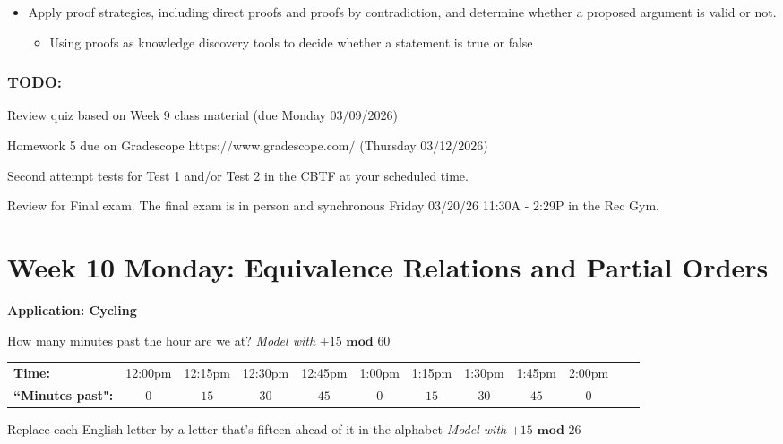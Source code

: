 \documentclass[12pt, oneside]{article}
\begin{document}
\begin{itemize}
\item Apply proof strategies, including direct proofs and proofs by contradiction, and determine whether a proposed argument is valid or not.
\begin{itemize}
    \item Using proofs as knowledge discovery tools to decide whether a statement is true or false
\end{itemize}
\end{itemize}

\subsubsection*{TODO:}
\begin{list}
   {\itemsep2pt}
    \item Review quiz based on Week 9 class material (due Monday 03/09/2026)
    \item Homework 5 due on Gradescope https://www.gradescope.com/ (Thursday 03/12/2026)
    \item Second attempt tests for Test 1 and/or Test 2 in the CBTF at your scheduled time.
   \item Review for Final exam. The final exam is in person and synchronous Friday 03/20/26 11:30A - 2:29P  in the Rec Gym.
\end{list}

\newpage
\section*{Week 10 Monday: Equivalence Relations and Partial Orders}


{\bf Application: Cycling}

How many minutes past the hour are we at?  \hfill {\it Model with} $+15 \textbf{ mod } 60$

\begin{tabular}{lccccccccccc}
{\bf Time:} &12:00pm  &12:15pm&12:30pm  &12:45pm&1:00pm  &1:15pm&1:30pm  &1:45pm&2:00pm \\
{\bf ``Minutes past":} &$0$ & $15$ & $30$ & $45$ &$0$ & $15$ & $30$ & $45$ &$0$\\
\end{tabular}
\vfill

Replace each English letter by a letter that's fifteen ahead of it in the alphabet
  \hfill {\it Model with} $+15 \textbf{ mod } 26$
\end{document}
